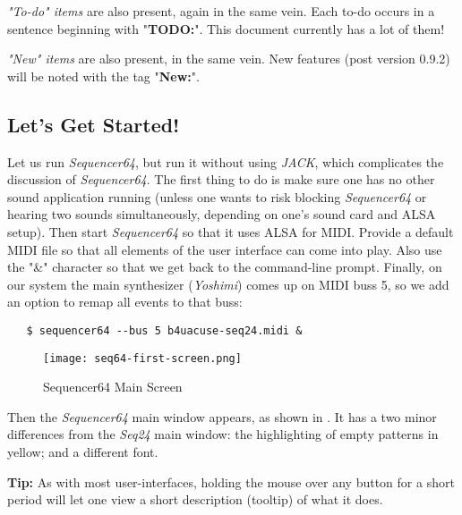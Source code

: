 \documentclass[
 11pt,
 twoside,
 a4paper,
 headinclude,
 footinclude,
 final                                 %
]{article}
\begin{document}
   \textsl{"To-do" items}
   are also present, again in the same vein.
   Each to-do occurs in a sentence beginning with "\textbf{TODO:}".
   This document currently has a lot of them!

   \textsl{"New" items}
   are also present, in the same vein.
   New features (post version 0.9.2) will be noted with the tag
   "\textbf{New:}".

\subsection{Let's Get Started!}
\label{subsec:introduction_lets_get_started}

   Let us run \textsl{Sequencer64}, but run it without using \textsl{JACK},
   which complicates the discussion of \textsl{Sequencer64}.  The first
   thing to do is make sure one has no other sound application running
   (unless one wants to risk blocking \textsl{Sequencer64} or hearing two
    sounds simultaneously, depending on one's sound card and ALSA setup).
   Then start \textsl{Sequencer64} so that it uses ALSA for MIDI.  Provide a
   default MIDI file so that all elements of the user interface can come
   into play.  Also use the "\&" character so that we get back to the
   command-line prompt.  Finally, on our system the main synthesizer
   (\textsl{Yoshimi}) comes up on MIDI buss 5, so we add an option to remap
   all events to that buss:

\begin{verbatim}
   $ sequencer64 --bus 5 b4uacuse-seq24.midi &
\end{verbatim}

\begin{figure}[H]
   \centering 
   \texttt{[image: seq64-first-screen.png]}
   \caption{Sequencer64 Main Screen}
   \label{fig:seq64_main_screen}
\end{figure}

   Then the \textsl{Sequencer64} main window appears, as shown in
   .  It has a two minor differences
   from the \textsl{Seq24} main window: the highlighting of
   empty patterns in yellow; and a different font.

   \textbf{Tip:}
   As with most user-interfaces, holding the mouse over any button for a
   short period will let one view a short description (tooltip)
   of what it does.

\end{document}
